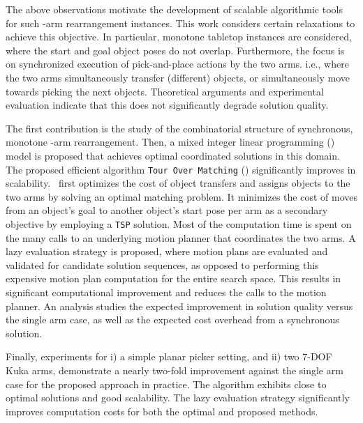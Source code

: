 The above observations motivate the development of scalable algorithmic
tools for such \dual-arm rearrangement instances. This work considers
certain relaxations to achieve this objective. In particular,
monotone tabletop instances are considered, where the start and goal
object poses do not overlap.  Furthermore, the focus is on
synchronized execution of pick-and-place actions by the two arms. i.e., where the two arms simultaneously transfer (different) objects, or simultaneously move towards picking the next objects.
Theoretical arguments and experimental evaluation indicate that this does not significantly degrade solution
quality.




The first contribution is the study of the combinatorial structure of
synchronous, monotone \dual-arm rearrangement. Then, a mixed integer linear programming (\milp) model is
proposed that achieves optimal coordinated solutions in this domain.
The proposed efficient algorithm {\tt Tour Over Matching} (\algo) significantly improves in scalability. \algo\ first optimizes the
cost of object transfers and assigns objects to the two arms by
solving an optimal matching problem. It minimizes the cost of
moves from an object's goal to another object's start pose per
arm as a secondary objective by employing a {\tt TSP} solution. Most
of the computation time is spent on the many calls to an underlying motion planner that coordinates the two arms. A lazy
evaluation strategy is proposed, where motion plans are evaluated and validated for candidate solution sequences, as opposed to performing this expensive motion plan computation for the entire search space. This results in significant computational improvement and
reduces the calls to the motion planner.  An analysis
studies the expected improvement in solution quality
versus the single arm case, as well as the expected cost overhead from a
synchronous solution. 

Finally, experiments for i) a simple planar picker setting, and ii) two 7-DOF Kuka arms, demonstrate a nearly two-fold
improvement against the single arm case for the proposed approach in practice. The algorithm exhibits close to optimal solutions and good scalability. 
The lazy evaluation strategy significantly improves computation costs for both the optimal and proposed methods. 

